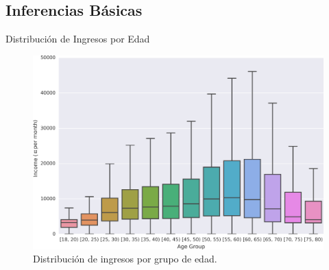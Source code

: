 \documentclass[usenames,dvipsnames,table]{beamer}
\begin{document}
\subsection{Inferencias Básicas}
\begin{frame}{Distribución de Ingresos por Edad}
	\begin{figure}
		\includegraphics[width=.80\framewidth]{income_age_boxplot4.png}
		\caption{Distribución de ingresos por grupo de edad.}
	\end{figure}
\end{frame}
\end{document}
